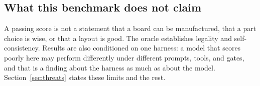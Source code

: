 \subsection{What this benchmark does not claim}

A passing score is not a statement that a board can be manufactured, that a part choice is wise, or that a layout is good. The oracle establishes legality and self-consistency. Results are also conditioned on one harness: a model that scores poorly here may perform differently under different prompts, tools, and gates, and that is a finding about the harness as much as about the model. Section~\ref{sec:threats} states these limits and the rest.
